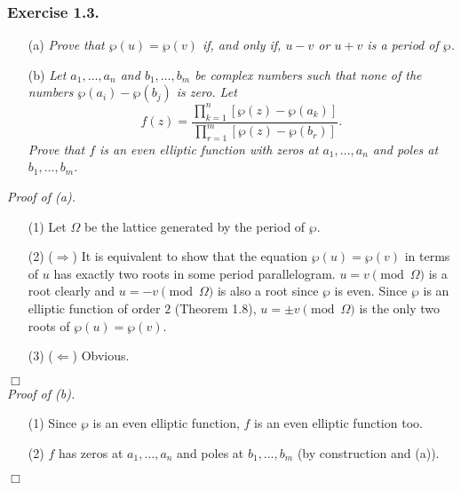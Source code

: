 \documentclass{article}
\begin{document}



\subsubsection*{Exercise 1.3.}
\begin{enumerate}
\item[(a)]
  \emph{Prove that $\wp(u) = \wp(v)$ if, and only if, $u-v$ or $u+v$ is a period of $\wp$.}

\item[(b)]
  \emph{Let $a_1, \ldots, a_n$ and $b_1, \ldots, b_m$ be complex numbers
  such that none of the numbers $\wp(a_i) - \wp(b_j)$ is zero.
  Let
  \[
    f(z) = \frac{\prod_{k=1}^{n}[\wp(z)-\wp(a_k)]}{\prod_{r=1}^{m}[\wp(z)-\wp(b_r)]}.
  \]
  Prove that $f$ is an even elliptic function with zeros at $a_1, \ldots, a_n$ and
  poles at $b_1, \ldots, b_m$.} \\
\end{enumerate}



\emph{Proof of (a).}
\begin{enumerate}
\item[(1)]
  Let $\Omega$ be the lattice generated by the period of $\wp$.

\item[(2)]
  ($\Longrightarrow$)
  It is equivalent to show that the equation $\wp(u) = \wp(v)$ in terms of $u$
  has exactly two roots in some period parallelogram.
  $u = v \pmod{\Omega}$ is a root clearly and
  $u = -v \pmod{\Omega}$ is also a root since $\wp$ is even.
  Since $\wp$ is an elliptic function of order $2$ (Theorem 1.8),
  $u = \pm v \pmod{\Omega}$ is the only two roots of $\wp(u) = \wp(v)$.

\item[(3)]
  ($\Longleftarrow$)
  Obvious.
\end{enumerate}
$\Box$ \\



\emph{Proof of (b).}
\begin{enumerate}
\item[(1)]
  Since $\wp$ is an even elliptic function, $f$ is an even elliptic function too.

\item[(2)]
  $f$ has zeros at $a_1, \ldots, a_n$ and poles at $b_1, \ldots, b_m$
  (by construction and (a)).
\end{enumerate}
$\Box$ \\\\
\end{document}

